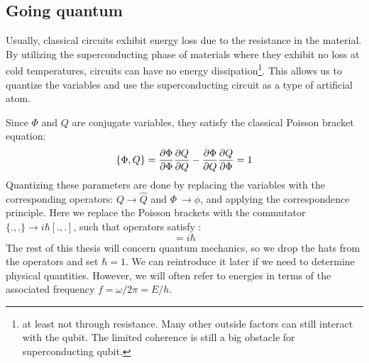 
\subsection{Going quantum}
 Usually, classical circuits exhibit energy loss due to the resistance in the material. By utilizing the superconducting phase of materials where they exhibit no loss at cold temperatures, circuits can have no energy dissipation\footnote{at least not through resistance. Many other outside factors can still interact with the qubit. The limited coherence is still a big obstacle for superconducting qubit.}. This allows us to quantize the variables and use the superconducting circuit as a type of artificial atom. \cite{superconduting}

Since $\Phi$ and $Q$ are conjugate variables, they satisfy the classical Poisson bracket equation:
\begin{equation}
    \{ \Phi, Q\} = \frac{\partial \Phi}{\partial \Phi}\frac{\partial Q}{\partial Q} - \frac{\partial \Phi}{\partial Q}\frac{\partial Q}{\partial \Phi} = 1
\end{equation}
Quantizing these parameters are done by replacing the variables with the corresponding operators: $Q \to \hat{Q}$ and $\Phi \ \to \phi$, and applying the correspondence principle. Here we replace the Poisson brackets with the commutator $\{., .\} \to i\hbar[., .]$, such that operators satisfy \cite{krantz_quantum_2019}:
\begin{equation}
    [\phi, \hat{Q}] = i\hbar
\end{equation}
The rest of this thesis will concern quantum mechanics, so we drop the hats from the operators and set $\hbar = 1$. We can reintroduce it later if we need to determine physical quantities. However, we will often refer to energies in terms of the associated frequency $f = \omega/2\pi = E / h$. 

